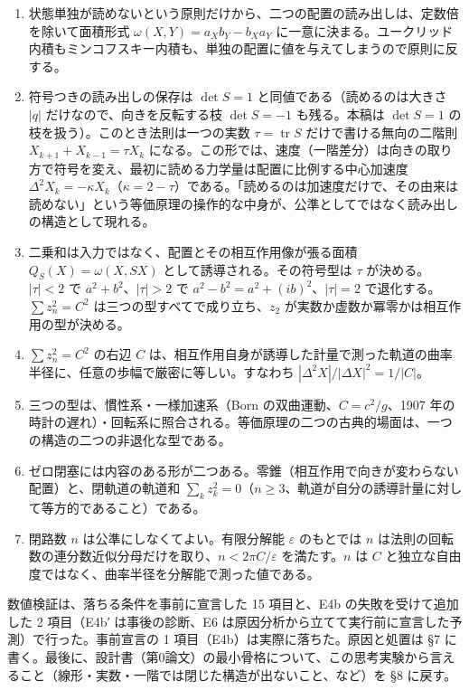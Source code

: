 \documentclass[
  a4paper,
]{ltjsarticle}
\providecommand{\tightlist}{%
  \setlength{\itemsep}{0pt}\setlength{\parskip}{0pt}}
\begin{document}
\begin{enumerate}
\def\labelenumi{\arabic{enumi}.}
\tightlist
\item
  状態単独が読めないという原則だけから、二つの配置の読み出しは、定数倍を除いて面積形式
  \(\omega(X,Y)=a_Xb_Y-b_Xa_Y\)
  に一意に決まる。ユークリッド内積もミンコフスキー内積も、単独の配置に値を与えてしまうので原則に反する。
\item
  符号つきの読み出しの保存は \(\det S=1\) と同値である（読めるのは大きさ
  \(\lvert q\rvert\) だけなので、向きを反転する枝 \(\det S=-1\)
  も残る。本稿は \(\det S=1\) の枝を扱う）。このとき法則は一つの実数
  \(\tau=\operatorname{tr}S\) だけで書ける無向の二階則
  \(X_{k+1}+X_{k-1}=\tau X_k\)
  になる。この形では、速度（一階差分）は向きの取り方で符号を変え、最初に読める力学量は配置に比例する中心加速度
  \(\Delta^2X_k=-\kappa X_k\)（\(\kappa=2-\tau\)）である。「読めるのは加速度だけで、その由来は読めない」という等価原理の操作的な中身が、公準としてではなく読み出しの構造として現れる。
\item
  二乗和は入力ではなく、配置とその相互作用像が張る面積
  \(Q_S(X)=\omega(X,SX)\) として誘導される。その符号型は \(\tau\)
  が決める。\(|\tau|<2\) で \(a^2+b^2\)、\(|\tau|>2\) で
  \(a^2-b^2=a^2+(ib)^2\)、\(|\tau|=2\) で退化する。\(\sum z_n^2=C^2\)
  は三つの型すべてで成り立ち、\(z_2\)
  が実数か虚数か冪零かは相互作用の型が決める。
\item
  \(\sum z_n^2=C^2\) の右辺 \(C\)
  は、相互作用自身が誘導した計量で測った軌道の曲率半径に、任意の歩幅で厳密に等しい。すなわち
  \(|\Delta^2X|/|\Delta X|^2=1/|C|\)。
\item
  三つの型は、慣性系・一様加速系（Born の双曲運動、\(C=c^2/g\)、1907
  年の時計の遅れ）・回転系に照合される。等価原理の二つの古典的場面は、一つの構造の二つの非退化な型である。
\item
  ゼロ閉塞には内容のある形が二つある。零錐（相互作用で向きが変わらない配置）と、閉軌道の軌道和
  \(\sum_k z_k^2=0\)（\(n\ge3\)、軌道が自分の誘導計量に対して等方的であること）である。
\item
  閉路数 \(n\) は公準にしなくてよい。有限分解能 \(\varepsilon\)
  のもとでは \(n\)
  は法則の回転数の連分数近似分母だけを取り、\(n<2\pi C/\varepsilon\)
  を満たす。\(n\) は \(C\)
  と独立な自由度ではなく、曲率半径を分解能で測った値である。
\end{enumerate}

数値検証は、落ちる条件を事前に宣言した 15 項目と、E4b
の失敗を受けて追加した 2 項目（E4b′ は事後の診断、E6
は原因分析から立てて実行前に宣言した予測）で行った。事前宣言の 1
項目（E4b）は実際に落ちた。原因と処置は §7
に書く。最後に、設計書（第0論文）の最小骨格について、この思考実験から言えること（線形・実数・一階では閉じた構造が出ないこと、など）を
§8 に戻す。
\end{document}
